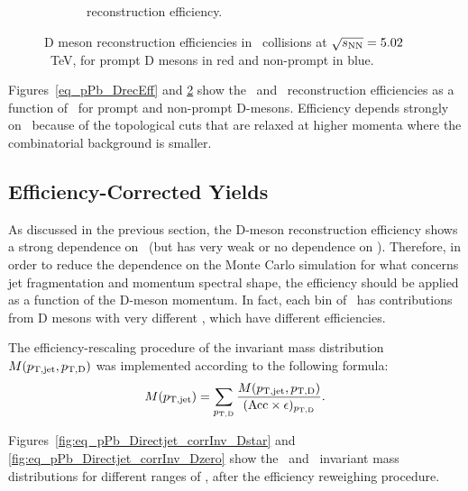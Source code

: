 \begin{figure}[bth]
\begin{subfigure}[d]{0.45\textwidth}
\caption{\Dzero\  reconstruction efficiency.}
\label{eq_pPb_DrecEff_Dzero}
\end{subfigure}
\caption{D meson reconstruction efficiencies in \pPb\ collisions at $\sqrt{s_{\rm NN}}=5.02$~TeV, for prompt D mesons in red and non-prompt in blue.}
\end{figure}
Figures~\ref{eq_pPb_DrecEff} and \ref{eq_pPb_DrecEff_Dzero} show the \Dstar\ and \Dzero\ reconstruction efficiencies as a function of \ptd\, 
for prompt and non-prompt D-mesons. Efficiency depends strongly on \ptd\ because of the topological cuts that are relaxed at higher momenta where the combinatorial background is smaller. 


\subsection{Efficiency-Corrected Yields}

As discussed in the previous section, the D-meson reconstruction efficiency shows a strong dependence on \ptd\ (but has very weak or no dependence on \ptjet).
Therefore, in order to reduce the dependence on the Monte Carlo simulation for what concerns jet fragmentation and momentum spectral shape,
the efficiency should be applied as a function of the D-meson momentum. In fact, each bin of \ptjet\ has contributions from D mesons with very different \ptd,
which have different efficiencies.

The efficiency-rescaling procedure of the invariant mass distribution $M(p_{\mathrm{T,jet}},p_{\mathrm{T,D}})$ was implemented according to the following formula:
\begin{equation}
M(p_{\mathrm{T,jet}}) = \displaystyle\sum_{p_{\mathrm{T,D}}}\frac{M(p_{\mathrm{T,jet}},p_{\mathrm{T,D}})}{({\rm Acc} \times \epsilon)_{p_{\mathrm{T,D}}}}.
\end{equation}

Figures~\ref{fig:eq_pPb_Directjet_corrInv_Dstar} and \ref{fig:eq_pPb_Directjet_corrInv_Dzero} show the \Dstar\ and \Dzero\ invariant mass distributions 
for different ranges of \ptchjet, after the efficiency reweighing procedure.

